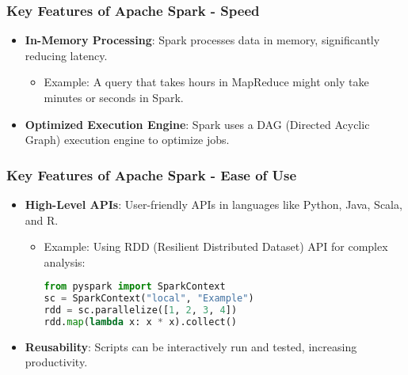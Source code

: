 \documentclass{beamer}
\begin{document}
\begin{frame}
    \frametitle{Key Features of Apache Spark - Speed}
    \begin{itemize}
        \item \textbf{In-Memory Processing}: Spark processes data in memory, significantly reducing latency.
        \begin{itemize}
            \item Example: A query that takes hours in MapReduce might only take minutes or seconds in Spark.
        \end{itemize}
        
        \item \textbf{Optimized Execution Engine}: Spark uses a DAG (Directed Acyclic Graph) execution engine to optimize jobs.
    \end{itemize}
\end{frame}

\begin{frame}[fragile]
    \frametitle{Key Features of Apache Spark - Ease of Use}
    \begin{itemize}
        \item \textbf{High-Level APIs}: User-friendly APIs in languages like Python, Java, Scala, and R.
        \begin{itemize}
            \item Example: Using RDD (Resilient Distributed Dataset) API for complex analysis:
            \begin{lstlisting}[language=Python]
from pyspark import SparkContext
sc = SparkContext("local", "Example")
rdd = sc.parallelize([1, 2, 3, 4])
rdd.map(lambda x: x * x).collect()
            \end{lstlisting}
        \end{itemize}
        
        \item \textbf{Reusability}: Scripts can be interactively run and tested, increasing productivity.
    \end{itemize}
\end{frame}
\end{document}
